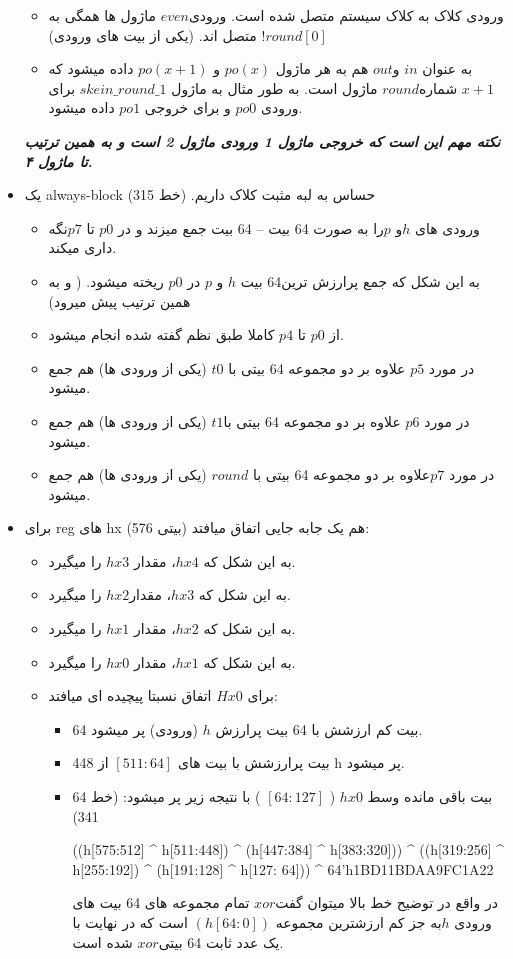 \begin{itemize}
 \begin{itemize}
 \item ورودی کلاک به کلاک سیستم متصل شده است.
ورودی$ even$ ماژول ها همگی به  $!round[0]$ متصل اند. (یکی از بیت های ورودی)
\item
به عنوان $in$ و$ out $ هم به هر ماژول $po(x)$ و $po(x+1)$ داده میشود که $x+1$ شماره$ round$ ماژول است. به طور مثال به ماژول $skein\_round\_1$ برای ورودی $po0$ و برای خروجی $po1$ داده میشود.
 \end{itemize}
\textit{\textbf{ نکته مهم این است که خروجی ماژول 1 ورودی ماژول 2 است و به همین ترتیب تا ماژول ۴.
}}
\item
یک always-block حساس به لبه مثبت کلاک داریم. (خط 315)
\begin{itemize}
\item
ورودی های $h $و $p $را به صورت 64 بیت – 64 بیت جمع میزند و در $p0$ تا $p7$نگه داری میکند.
\item
به این شکل که جمع پرارزش ترین64 بیت $h$ و $p$ در $p0$ ریخته میشود. ( و به همین ترتیب پیش میرود)
\item
از $p0$ تا $p4$ کاملا طبق نظم گفته شده انجام میشود.
\item
در مورد $p5$ علاوه بر دو مجموعه 64 بیتی با $t0$ (یکی از ورودی ها) هم جمع میشود.
\item
در مورد $ p6$ علاوه بر دو مجموعه 64 بیتی با$ t1$ (یکی از ورودی ها) هم جمع میشود.
\item
در مورد $ p7 $علاوه بر دو مجموعه 64 بیتی با $round$ (یکی از ورودی ها) هم جمع میشود.
\end{itemize}
\item
برای reg های hx (576 بیتی) هم یک جابه جایی اتفاق میافتد:
\begin{itemize}
\item
به این شکل که $hx4$، مقدار $hx3$ را میگیرد.
\item
به این شکل که $hx3$، مقدار$ hx2$ را میگیرد.
\item
به این شکل که $hx2$، مقدار $hx1$ را میگیرد.
\item
به این شکل که $hx1$، مقدار $hx0$ را میگیرد.
\item
برای $Hx0$ اتفاق نسبتا پیچیده ای میافتد:
\begin{itemize}
\item
64 بیت کم ارزشش با 64 بیت پرارزش $h$ (ورودی) پر میشود.
\item
448 بیت پرارزشش  با بیت های $[511:64]$ از h پر میشود.
\item
64 بیت باقی مانده وسط $hx0$ ( $[64:127]$ ) با نتیجه زیر پر میشود:  (خط 341)
\begin{code}
((h[575:512] ^ h[511:448]) ^ (h[447:384] ^ h[383:320])) ^ ((h[319:256] ^ h[255:192]) ^  (h[191:128] ^ h[127: 64])) ^ 64'h1BD11BDAA9FC1A22
\end{code}

در واقع در توضیح خط بالا میتوان گفت$ xor$ تمام مجموعه های 64 بیت های ورودی $h $به جز کم ارزشترین مجموعه $( h[64:0] )$ است که در نهایت با یک عدد ثابت 64 بیتی$ xor$ شده است.

\end{itemize}
\end{itemize}
\end{itemize}

